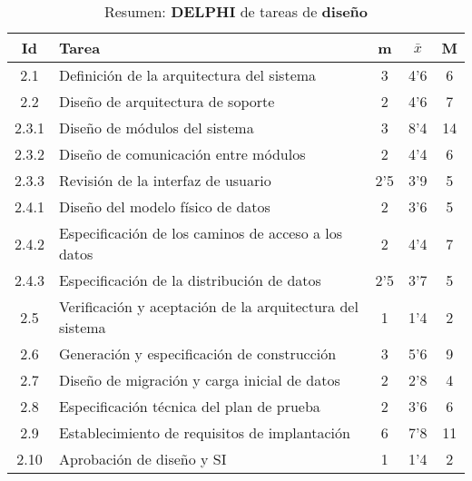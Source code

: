 \documentclass[11pt,a4paper,spanish,twoside]{report}
\begin{document}
\begin{table}[!h]
\centering
  \begin{tabular}{|c||p{8cm}||c|c|c|}
    \hline
    \textbf{Id} & \textbf{Tarea} & \textbf{m} & 
    \textbf{$\bar{x}$} &\textbf{M} \\
    \hline \hline
    2.1 & Definición de la arquitectura del sistema & 3 & 4'6 & 6 \\
    \hline
    2.2 & Diseño de arquitectura de soporte & 2 & 4'6 & 7 \\
    \hline
    2.3.1 & Diseño de módulos del sistema & 3 & 8'4 & 14 \\
    \hline
    2.3.2 & Diseño de comunicación entre módulos & 2 & 4'4 & 6 \\
    \hline
    2.3.3 & Revisión de la interfaz de usuario &2'5 & 3'9 & 5 \\
    \hline
    2.4.1 & Diseño del modelo físico de datos & 2 & 3'6 & 5 \\
    \hline
    2.4.2 & Especificación de los caminos de acceso a los datos & 2 & 4'4 & 7\\
    \hline
    2.4.3 & Especificación de la distribución de datos & 2'5 & 3'7 & 5 \\
    \hline
    2.5 & Verificación y aceptación de la arquitectura del sistema & 1 & 1'4
    & 2 \\
    \hline
    2.6 & Generación y especificación de construcción & 3 & 5'6 & 9 \\
    \hline
    2.7 & Diseño de migración y carga inicial de datos & 2 & 2'8 & 4 \\
    \hline
    2.8 & Especificación técnica del plan de prueba & 2 & 3'6 & 6 \\
    \hline
    2.9 & Establecimiento de requisitos de implantación & 6 & 7'8 & 11 \\
    \hline
    2.10 & Aprobación de diseño y SI & 1 & 1'4 & 2 \\
    \hline
  \end{tabular}
  \caption{Resumen: \textbf{DELPHI} de tareas de \textbf{diseño}}
  \label{Tab:rDELPHIdis}
\end{table}
\end{document}
